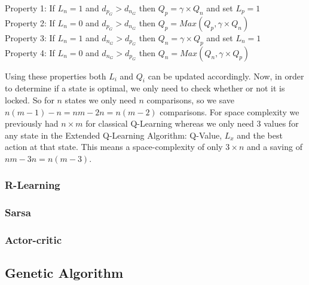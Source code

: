 \vspace{1\baselineskip}\vspace{-\parskip}

\begin{flushleft}
Property 1: If $L_n=1$ and $d_p_G > d_n_G$ then $Q_p = \gamma \times Q_n$ and set $L_p=1$\\
Property 2: If $L_n=0$ and $d_p_G > d_n_G$ then $Q_p = Max(Q_p,\gamma \times Q_n)$\\
Property 3: If $L_n=1$ and $d_n_G > d_p_G$ then $Q_n = \gamma \times Q_p$ and set $L_n=1$\\
Property 4: If $L_n=0$ and $d_n_G > d_p_G$ then $Q_n = Max(Q_n,\gamma \times Q_p)$\\
\end{flushleft}

\vspace{1\baselineskip}\vspace{-\parskip}

Using these properties both $L_i$ and $Q_i$ can be updated accordingly. Now, in order to determine if a state is optimal, we only need to check whether or not it is locked. So for $n$ states we only need $n$ comparisons, so we save $n(m-1)-n=nm-2n=n(m-2)$ \cite{11} comparisons.
For space complexity we previously had $n \times m $ for classical Q-Learning whereas we only need $3$ values for any state in the Extended Q-Learning Algorithm: Q-Value, $L_x$ and the best action at that state. This means a space-complexity of only $3 \times n$ and a saving of $nm-3n=n(m-3)$.\cite{11}


\subsubsection{R-Learning}
\label{sec:r-learning}

\subsubsection{Sarsa}
\label{sec:sarsa}

\subsubsection{Actor-critic}
\label{sec:actor-critic}

\subsection{Genetic Algorithm}
\label{sec:genetic_algorithm}

